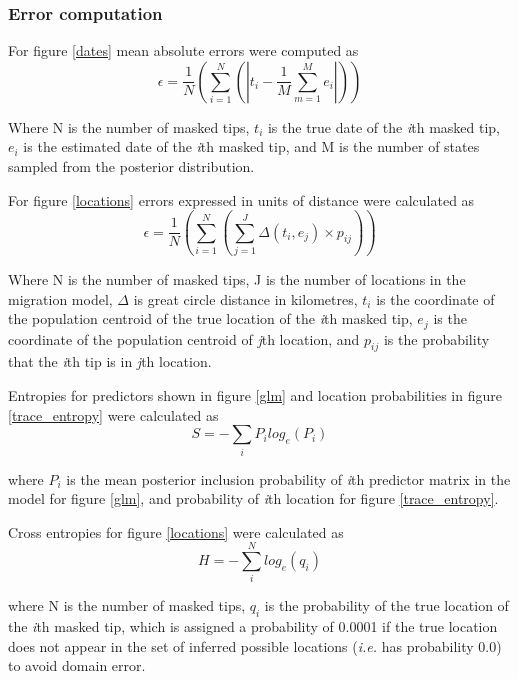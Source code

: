 \documentclass{bmcart}
\begin{document}
\subsubsection*{Error computation}
For figure \ref{dates} mean absolute errors were computed as
\begin{equation}
    \epsilon = \frac{1}{N} (\sum_{i=1}^{N} (| t_{i} - \frac{1}{M} \sum_{m=1}^{M} e_{i}|))
\end{equation}

Where N is the number of masked tips, $t_{i}$ is the true date of the \textit{i}th masked tip, $e_{i}$ is the estimated date of the \textit{i}th masked tip, and M is the number of states  sampled from the posterior distribution.

For figure \ref{locations} errors expressed in units of distance were calculated as
\begin{equation}
  \epsilon = \frac{1}{N} (\sum_{i=1}^{N} (\sum_{j=1}^{J} \Delta(t_{i},e_{j})\times p_{ij}))
\end{equation}

Where N is the number of masked tips, J is the number of locations in the migration model, $\Delta$ is great circle distance in kilometres, $t_{i}$ is the coordinate of the population centroid of the true location of the \textit{i}th masked tip, $e_{j}$ is the coordinate of the population centroid of \textit{j}th location, and $p_{ij}$ is the probability that the \textit{i}th tip is in \textit{j}th location.

Entropies for predictors shown in figure \ref{glm} and location probabilities in figure \ref{trace_entropy} were calculated as
\begin{equation}
  S = -\sum_{i} P_{i} log_{e}(P_{i})
\end{equation}

where $P_{i}$ is the mean posterior inclusion probability of \textit{i}th predictor matrix in the model for figure \ref{glm}, and probability of \textit{i}th location for figure \ref{trace_entropy}.

Cross entropies for figure \ref{locations} were calculated as
\begin{equation}
  H = -\sum_{i}^{N} log_{e}(q_{i})
\end{equation}

where N is the number of masked tips, $q_{i}$ is the probability of the true location of the \textit{i}th masked tip, which is assigned a probability of 0.0001 if the true location does not appear in the set of inferred possible locations (\textit{i.e.} has probability 0.0) to avoid domain error.
\end{document}
